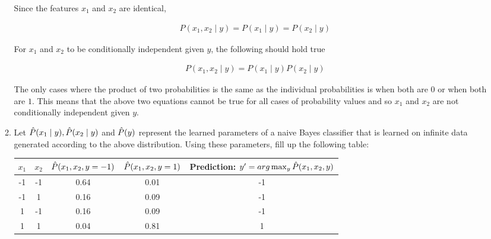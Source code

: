 \begin{enumerate}
\begin{enumerate}
Since the features $x_1$ and $x_2$ are identical,
    
\begin{equation*}
\begin{aligned}
P(x_1,x_2 \mid y) = P(x_1 \mid y) = P(x_2 \mid y)
\end{aligned}
\end{equation*} 

For $x_1$ and $x_2$ to be conditionally independent given $y$, the following should hold true

\begin{equation*}
\begin{aligned}
P(x_1,x_2 \mid y) = P(x_1 \mid y) P(x_2 \mid y)
\end{aligned}
\end{equation*} 

The only cases where the product of two probabilities is the same as the individual probabilities is when both are $0$ or when both are $1$. This means that the above two equations cannot be true for all cases of probability values and so $x_1$ and $x_2$ are not conditionally independent given $y$.
    
  \item \relax[8 points] Let $\hat{P}(x_1 \mid y), \hat{P}(x_2 \mid y)$ and
    $\hat{P}(y)$ represent the learned parameters of a naive Bayes
    classifier that is learned on infinite data generated according to
    the above distribution. Using these parameters, fill up the
    following table:


    \begin{tabular}{|c|c|c|c|c|}
      \hline
      $x_1$ & $x_2$ & $\hat{P}(x_1, x_2, y= -1)$ & $\hat{P}(x_1, x_2, y=1)$ & {\bf Prediction: $y' = arg\max_y \hat{P}(x_1, x_2, y)$} \\
      \hline
      -1    & -1    &    0.64                    & 0.01                     &    -1                                               \\
      -1    & 1     &     0.16                   &  0.09                    &     -1                                              \\
      1     & -1    &      0.16                  &   0.09                   &      -1                                             \\
      1     & 1     &      0.04                  &   0.81                   &       1                                            \\
      \hline
    \end{tabular}


\end{enumerate}
\end{enumerate}
